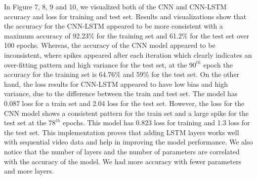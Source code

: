 \documentclass{vldb}
\begin{document}
In Figure 7, 8, 9 and 10, we visualized both of the CNN and CNN-LSTM accuracy and loss for training and test set. Results and visualizations show that the accuracy for the CNN-LSTM appeared to be more consistent with a maximum accuracy of 92.23\% for the training set and 61.2\% for the test set over 100 epochs. Whereas, the accuracy of the CNN model appeared to be inconsistent, where spikes appeared after each iteration which clearly indicates an over-fitting pattern and high variance for the test set, at the $90^{th}$ epoch the accuracy for the training set is 64.76\% and 59\% for the test set. On the other hand, the loss results for CNN-LSTM appeared to have low bias and high variance, due to the difference between the train and test set. The model has 0.087 loss for a train set and 2.04 loss for the test set. However, the loss for the CNN model shows a consistent pattern for the train set and a large spike for the test set at the $78^{th}$ epochs. This model has 0.823 loss for training and 1.3 loss for the test set. This implementation proves that adding LSTM layers works well with sequential video data and help in improving the model performance. We also notice that the number of layers and the number of parameters are correlated with the accuracy of the model. We had more accuracy with fewer parameters and more layers.
\end{document}
